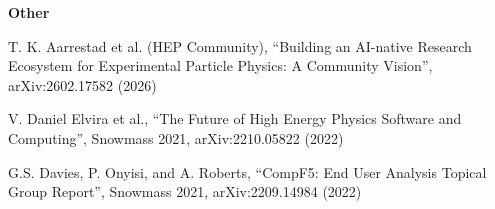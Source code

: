 {\bf Other}
\begin{list2}
\item T. K. Aarrestad et al. (HEP Community), ``Building an AI-native Research Ecosystem for Experimental Particle Physics: A Community Vision'', arXiv:2602.17582 (2026)
\item V. Daniel Elvira et al., ``The Future of High Energy Physics Software and Computing'', Snowmass 2021, arXiv:2210.05822 (2022)
\item G.S. Davies, P. Onyisi, and A. Roberts, ``CompF5: End User Analysis Topical Group Report'', Snowmass 2021, arXiv:2209.14984 (2022)
\end{list2}
